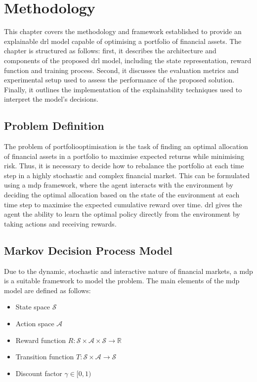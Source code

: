 \chapter{Methodology} \label{ch:methodology}

This chapter covers the methodology and framework established to provide an explainable \acrfull{drl} model capable of optimising a portfolio of financial assets. The chapter is structured as follows: first, it describes the architecture and components of the proposed \acrshort{drl} model, including the state representation, reward function and training process. Second, it discusses the evaluation metrics and experimental setup used to assess the performance of the proposed solution. Finally, it outlines the implementation of the explainability techniques used to interpret the model's decisions. 

\section{Problem Definition} \label{sec:problem-definition}

The problem of \gls{portfoliooptimisation} is the task of finding an optimal allocation of financial assets in a portfolio to maximise expected returns while minimising risk. Thus, it is necessary to decide how to rebalance the portfolio at each time step in a highly stochastic and complex financial market. This can be formulated using a \acrfull{mdp} framework, where the agent interacts with the environment by deciding the optimal allocation based on the state of the environment at each time step to maximise the expected cumulative reward over time. \acrfull{drl} gives the agent the ability to learn the optimal policy directly from the environment by taking actions and receiving rewards. 

\section{Markov Decision Process Model} \label{sec:mdp-model}

Due to the dynamic, stochastic and interactive nature of financial markets, a \acrlong{mdp} is a suitable framework to model the problem. The main elements of the \acrshort{mdp} model are defined as follows:
\begin{itemize}
    \item State space $\mathcal{S}$
    \item Action space $\mathcal{A}$
    \item Reward function $R: \mathcal{S} \times \mathcal{A} \times \mathcal{S} \to \mathbb{R}$
    \item Transition function $T: \mathcal{S} \times \mathcal{A} \to \mathcal{S}$
    \item Discount factor $\gamma \in [0,1)$
\end{itemize}

